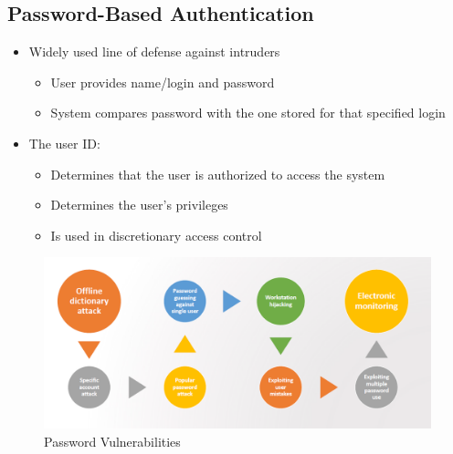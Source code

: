 \documentclass{article}
\begin{document}
        \subsection{Password-Based Authentication}
        \begin{itemize}
            \item Widely used line of defense against intruders
            \begin{itemize}
                \item User provides name/login and password
                \item System compares password with the one stored for that specified login
            \end{itemize}
            \item The user ID:
                \begin{itemize}
                    \item Determines that the user is authorized to access the system
                    \item Determines the user’s privileges
                    \item Is used in discretionary access control
                \end{itemize}          
        \end{itemize}

        \begin{figure}[h]
            \begin{center}
                \includegraphics[scale=0.6]{../immagini/password_vulnerabelities.png}
            \end{center}
            \caption{Password Vulnerabilities}
        \end{figure}
        
\end{document}
